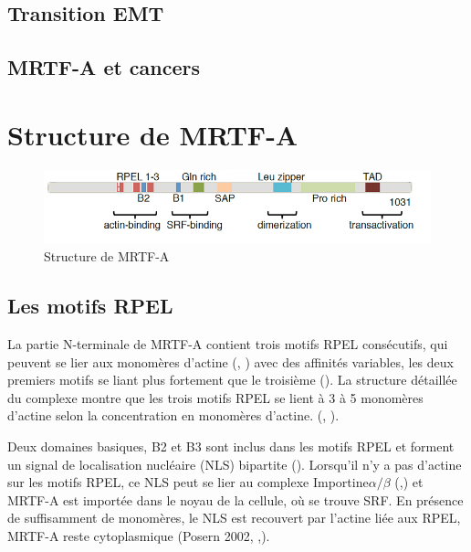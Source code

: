 \documentclass{report}
\begin{document}
\subsection{Transition EMT}
\subsection{MRTF-A et cancers}

\newpage
\section*{Structure de MRTF-A}

\begin{figure}
\center
\includegraphics[scale=0.5]{MRTFA_structure.png}
\caption{Structure de MRTF-A \parencite{scharenberg_tgf-_2014}}
\end{figure}
 \subsection{Les motifs RPEL}
 
 La partie N-terminale de MRTF-A contient trois motifs RPEL consécutifs, qui peuvent se lier aux monomères d'actine (\cite{posern_mutant_2004}, \cite{mouilleron_molecular_2008}) avec des affinités variables, les deux premiers motifs se liant plus fortement que le troisième (\cite{guettler_rpel_2008}). La structure détaillée du complexe montre que les trois motifs RPEL se lient à 3 à 5 monomères d'actine selon la concentration en monomères d'actine. (\cite{hirano_sensing_2011}, \cite{treisman_structure_2011}). 
 
 Deux domaines basiques, B2 et B3 sont inclus dans les motifs RPEL et forment un signal de localisation nucléaire (NLS) bipartite (\cite{rajakyla_actin-regulated_2010}). Lorsqu'il n'y a pas d'actine sur les motifs RPEL, ce NLS peut se lier au complexe Importine$\alpha / \beta$ (\cite{hirano_sensing_2011},\cite{rajakyla_actin-regulated_2010}) et MRTF-A est importée dans le noyau de la cellule, où se trouve SRF. En présence de suffisamment de monomères, le NLS est recouvert par l'actine liée aux RPEL, MRTF-A reste cytoplasmique (Posern 2002, \cite{miralles_actin_2003},\cite{posern_mutant_2004}). 
 
\end{document}
